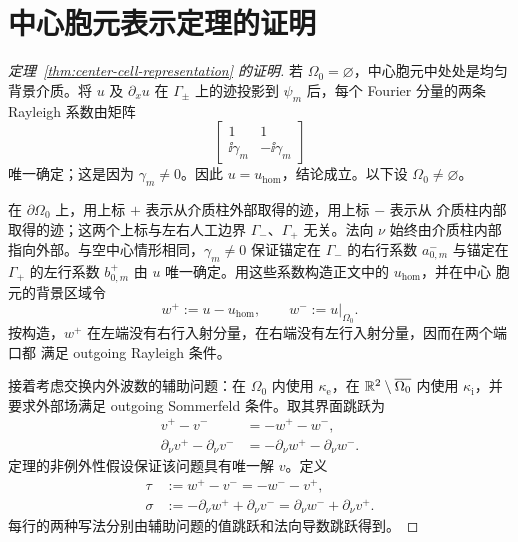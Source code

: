 \clearpage
\appendix

\section{中心胞元表示定理的证明}
\label{app:center-cell-representation}

\begin{proof}[定理~\ref{thm:center-cell-representation} 的证明]
  若 $\Omega_0=\varnothing$，中心胞元中处处是均匀背景介质。将 $u$ 及
  $\partial_xu$ 在 $\Gamma_\pm$ 上的迹投影到 $\psi_m$ 后，每个 Fourier 分量的两条
  Rayleigh 系数由矩阵
  \begin{equation*}
    \begin{bmatrix}
      1&1\\ \ii\gamma_m&-\ii\gamma_m
    \end{bmatrix}
  \end{equation*}
  唯一确定；这是因为 $\gamma_m\ne0$。因此 $u=u_{\mathrm{hom}}$，结论成立。以下设
  $\Omega_0\ne\varnothing$。

  在 $\partial\Omega_0$ 上，用上标 $+$ 表示从介质柱外部取得的迹，用上标 $-$ 表示从
  介质柱内部取得的迹；这两个上标与左右人工边界 $\Gamma_-$、$\Gamma_+$ 无关。法向
  $\nu$ 始终由介质柱内部指向外部。与空中心情形相同，$\gamma_m\ne0$ 保证锚定在
  $\Gamma_-$ 的右行系数 $a_{0,m}^-$ 与锚定在 $\Gamma_+$ 的左行系数
  $b_{0,m}^+$ 由 $u$ 唯一确定。用这些系数构造正文中的 $u_{\mathrm{hom}}$，并在中心
  胞元的背景区域令
  \begin{equation*}
    w^+:=u-u_{\mathrm{hom}},
    \qquad w^-:=u|_{\Omega_0}.
  \end{equation*}
  按构造，$w^+$ 在左端没有右行入射分量，在右端没有左行入射分量，因而在两个端口都
  满足 outgoing Rayleigh 条件。

  接着考虑交换内外波数的辅助问题：在 $\Omega_0$ 内使用
  $\kappa_{\mathrm e}$，在 $\mathbb{R}^2\setminus\overline{\Omega_0}$ 内使用
  $\kappa_{\mathrm i}$，并要求外部场满足 outgoing Sommerfeld 条件。取其界面跳跃为
  \begin{align*}
    v^+-v^-&=-w^+-w^-,\\
    \partial_\nu v^+-\partial_\nu v^-
    &=-\partial_\nu w^+-\partial_\nu w^-.
  \end{align*}
  定理的非例外性假设保证该问题具有唯一解 $v$。定义
  \begin{align*}
    \tau&:=w^+-v^-=-w^--v^+,\\
    \sigma&:=-\partial_\nu w^++\partial_\nu v^-
      =\partial_\nu w^-+\partial_\nu v^+.
  \end{align*}
  每行的两种写法分别由辅助问题的值跳跃和法向导数跳跃得到。


\end{proof}
